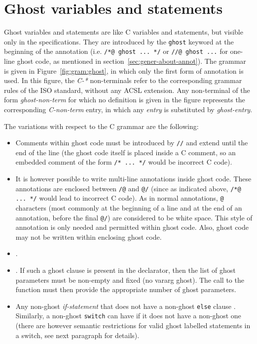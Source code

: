 \section{Ghost variables and statements}
\label{sec:ghost}
Ghost variables and statements are like C variables and statements,
but visible only in the specifications. They are introduced by the
\lstinline|ghost| keyword at the beginning of the annotation
(i.e. \lstinline|/*@ ghost ... */| or \lstinline|//@ ghost ...|
for one-line
ghost code, as mentioned in section~\ref{sec:gener-about-annot}).
The grammar is given in Figure~\ref{fig:gram:ghost}, in which only the
first form of annotation is used. In this figure, the \textit{C-*}
non-terminals refer to the corresponding grammar rules of the ISO standard,
without any ACSL extension. Any non-terminal of the form
\textit{ghost-non-term} for which no definition is given in the figure
represents the corresponding \textit{C-non-term} entry, in which any
\textit{entry} is substituted by \textit{ghost-entry}.

The variations with respect to the C
grammar are the following:
\begin{itemize}
\item Comments within ghost code must be introduced by \lstinline|//| and extend until the
  end of the line (the ghost code itself is placed inside a C
  comment, so an embedded comment of the form \lstinline|/* ... */| would be incorrect C code).
\item It is however possible to write multi-line annotations inside ghost
  code. These annotations are enclosed between
  \lstinline|/@| and \lstinline|@/|
  (since as indicated above, \lstinline|/*@ ... */| would lead
  to incorrect C code).
  As in normal annotations, \lstinline|@| characters (most commonly at the beginning of a
  line and at the end of an annotation, before the final \lstinline|@/|) are
  considered to be white space. 
  This style of annotation is only needed and permitted within ghost code.
  Also, ghost code may not be written within enclosing ghost code.
  
\item {}.
\item {}.
  If such a ghost
  clause is present in the declarator, then the list of ghost
  parameters must be non-empty and fixed (no vararg ghost). The call
  to the function must then provide the appropriate number of ghost parameters.
\item Any non-ghost \textit{if-statement} that does not have a non-ghost
  \lstinline|else| clause . Similarly, a non-ghost
  \lstinline|switch| can have 
  if it does not have a non-ghost one
  (there are however semantic restrictions for valid
  ghost labelled statements in a switch, see next paragraph for details).
\end{itemize}

